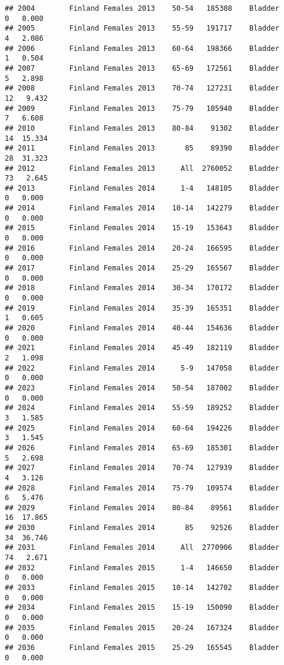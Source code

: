 \documentclass[
]{article}
\begin{document}
\begin{verbatim}
## 2004        Finland Females 2013    50-54   185308    Bladder      0   0.000
## 2005        Finland Females 2013    55-59   191717    Bladder      4   2.086
## 2006        Finland Females 2013    60-64   198366    Bladder      1   0.504
## 2007        Finland Females 2013    65-69   172561    Bladder      5   2.898
## 2008        Finland Females 2013    70-74   127231    Bladder     12   9.432
## 2009        Finland Females 2013    75-79   105940    Bladder      7   6.608
## 2010        Finland Females 2013    80-84    91302    Bladder     14  15.334
## 2011        Finland Females 2013       85    89390    Bladder     28  31.323
## 2012        Finland Females 2013      All  2760052    Bladder     73   2.645
## 2013        Finland Females 2014      1-4   148105    Bladder      0   0.000
## 2014        Finland Females 2014    10-14   142279    Bladder      0   0.000
## 2015        Finland Females 2014    15-19   153643    Bladder      0   0.000
## 2016        Finland Females 2014    20-24   166595    Bladder      0   0.000
## 2017        Finland Females 2014    25-29   165567    Bladder      0   0.000
## 2018        Finland Females 2014    30-34   170172    Bladder      0   0.000
## 2019        Finland Females 2014    35-39   165351    Bladder      1   0.605
## 2020        Finland Females 2014    40-44   154636    Bladder      0   0.000
## 2021        Finland Females 2014    45-49   182119    Bladder      2   1.098
## 2022        Finland Females 2014      5-9   147058    Bladder      0   0.000
## 2023        Finland Females 2014    50-54   187002    Bladder      0   0.000
## 2024        Finland Females 2014    55-59   189252    Bladder      3   1.585
## 2025        Finland Females 2014    60-64   194226    Bladder      3   1.545
## 2026        Finland Females 2014    65-69   185301    Bladder      5   2.698
## 2027        Finland Females 2014    70-74   127939    Bladder      4   3.126
## 2028        Finland Females 2014    75-79   109574    Bladder      6   5.476
## 2029        Finland Females 2014    80-84    89561    Bladder     16  17.865
## 2030        Finland Females 2014       85    92526    Bladder     34  36.746
## 2031        Finland Females 2014      All  2770906    Bladder     74   2.671
## 2032        Finland Females 2015      1-4   146650    Bladder      0   0.000
## 2033        Finland Females 2015    10-14   142702    Bladder      0   0.000
## 2034        Finland Females 2015    15-19   150090    Bladder      0   0.000
## 2035        Finland Females 2015    20-24   167324    Bladder      0   0.000
## 2036        Finland Females 2015    25-29   165545    Bladder      0   0.000

\end{verbatim}
\end{document}
